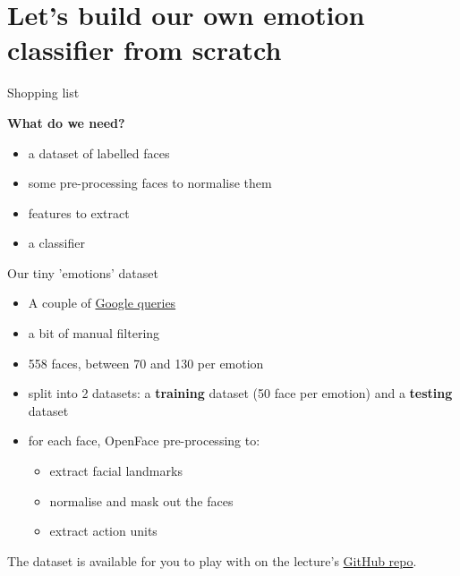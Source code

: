 \documentclass[compress]{beamer}
\begin{document}
\section[Emotion classifier]{Let's build our own emotion classifier from scratch}

\begin{frame}{Shopping list}

    \begin{center}
        {\bf What do we need?}
    \end{center}

    \pause

    \begin{itemize}
        \item<+-> a dataset of labelled faces
        \item<+-> some pre-processing faces to normalise them
        \item<+-> features to extract
        \item<+-> a classifier
    \end{itemize}
\end{frame}


\begin{frame}{Our tiny 'emotions' dataset}
    \begin{itemize}
        \item A couple of \href{https://www.google.co.uk/search?q=human+face+happiness&tbm=isch&source=lnt&tbs=itp:face}{Google queries}
        \item a bit of manual filtering
        \item 558 faces, between 70 and 130 per emotion
        \item split into 2 datasets: a {\bf training} dataset (50 face per
            emotion) and a {\bf testing} dataset
        \item for each face, OpenFace pre-processing to:
            \begin{itemize}
                \item extract facial landmarks
                \item normalise and mask out the faces
                \item extract action units
            \end{itemize}
    \end{itemize}

    The dataset is available for you to play with on the lecture's
    \href{https://github.com/severin-lemaignan/lecture-hri-emotions}{GitHub repo}.
\end{frame}
\end{document}
